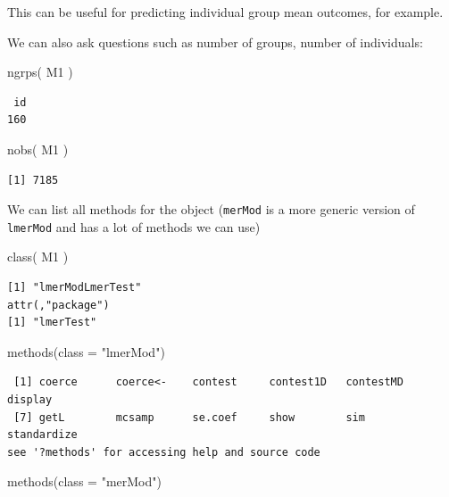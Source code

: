\documentclass[
  letterpaper,
  DIV=11,
  numbers=noendperiod]{scrreprt}
\newenvironment{Shaded}{\begin{snugshade}}{\end{snugshade}}
\newcommand{\AttributeTok}[1]{\textcolor[rgb]{0.49,0.56,0.16}{#1}}
\newcommand{\FunctionTok}[1]{\textcolor[rgb]{0.02,0.16,0.49}{#1}}
\newcommand{\NormalTok}[1]{\textcolor[rgb]{0.00,0.44,0.13}{#1}}
\newcommand{\StringTok}[1]{\textcolor[rgb]{0.25,0.44,0.63}{#1}}
\begin{document}
This can be useful for predicting individual group mean outcomes, for
example.

We can also ask questions such as number of groups, number of
individuals:

\begin{Shaded}
\begin{Highlighting}[]
\FunctionTok{ngrps}\NormalTok{( M1 )}
\end{Highlighting}
\end{Shaded}

\begin{verbatim}
 id 
160 
\end{verbatim}

\begin{Shaded}
\begin{Highlighting}[]
\FunctionTok{nobs}\NormalTok{( M1 )}
\end{Highlighting}
\end{Shaded}

\begin{verbatim}
[1] 7185
\end{verbatim}

We can list all methods for the object (\texttt{merMod} is a more
generic version of \texttt{lmerMod} and has a lot of methods we can use)

\begin{Shaded}
\begin{Highlighting}[]
\FunctionTok{class}\NormalTok{( M1 )}
\end{Highlighting}
\end{Shaded}

\begin{verbatim}
[1] "lmerModLmerTest"
attr(,"package")
[1] "lmerTest"
\end{verbatim}

\begin{Shaded}
\begin{Highlighting}[]
\FunctionTok{methods}\NormalTok{(}\AttributeTok{class =} \StringTok{"lmerMod"}\NormalTok{)}
\end{Highlighting}
\end{Shaded}

\begin{verbatim}
 [1] coerce      coerce<-    contest     contest1D   contestMD   display    
 [7] getL        mcsamp      se.coef     show        sim         standardize
see '?methods' for accessing help and source code
\end{verbatim}

\begin{Shaded}
\begin{Highlighting}[]
\FunctionTok{methods}\NormalTok{(}\AttributeTok{class =} \StringTok{"merMod"}\NormalTok{)}
\end{Highlighting}
\end{Shaded}
\end{document}
